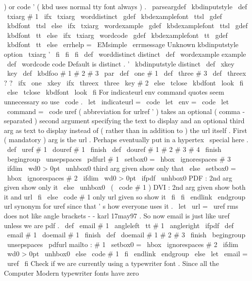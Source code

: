 )
%
or
code
'
(
kbd
uses
normal
tty
font
always
)
.
\
parseargdef
\
kbdinputstyle
{
%
\
def
\
txiarg
{
#
1
}
%
\
ifx
\
txiarg
\
worddistinct
\
gdef
\
kbdexamplefont
{
\
ttsl
}
\
gdef
\
kbdfont
{
\
ttsl
}
%
\
else
\
ifx
\
txiarg
\
wordexample
\
gdef
\
kbdexamplefont
{
\
ttsl
}
\
gdef
\
kbdfont
{
\
tt
}
%
\
else
\
ifx
\
txiarg
\
wordcode
\
gdef
\
kbdexamplefont
{
\
tt
}
\
gdef
\
kbdfont
{
\
tt
}
%
\
else
\
errhelp
=
\
EMsimple
\
errmessage
{
Unknown
kbdinputstyle
option
\
txiarg
'
}
%
\
fi
\
fi
\
fi
}
\
def
\
worddistinct
{
distinct
}
\
def
\
wordexample
{
example
}
\
def
\
wordcode
{
code
}
%
Default
is
distinct
.
'
\
kbdinputstyle
distinct
\
def
\
xkey
{
\
key
}
\
def
\
kbdfoo
#
1
#
2
#
3
\
par
{
\
def
\
one
{
#
1
}
\
def
\
three
{
#
3
}
\
def
\
threex
{
?
?
}
%
\
ifx
\
one
\
xkey
\
ifx
\
threex
\
three
\
key
{
#
2
}
%
\
else
{
\
tclose
{
\
kbdfont
\
look
}
}
\
fi
\
else
{
\
tclose
{
\
kbdfont
\
look
}
}
\
fi
}
%
For
indicateurl
env
command
quotes
seem
unnecessary
so
use
\
code
.
\
let
\
indicateurl
=
\
code
\
let
\
env
=
\
code
\
let
\
command
=
\
code
%
uref
(
abbreviation
for
urlref
'
)
takes
an
optional
(
comma
-
separated
)
%
second
argument
specifying
the
text
to
display
and
an
optional
third
%
arg
as
text
to
display
instead
of
(
rather
than
in
addition
to
)
the
url
%
itself
.
First
(
mandatory
)
arg
is
the
url
.
Perhaps
eventually
put
in
%
a
hypertex
\
special
here
.
%
\
def
\
uref
#
1
{
\
douref
#
1
\
finish
}
\
def
\
douref
#
1
#
2
#
3
#
4
\
finish
{
\
begingroup
\
unsepspaces
\
pdfurl
{
#
1
}
%
\
setbox0
=
\
hbox
{
\
ignorespaces
#
3
}
%
\
ifdim
\
wd0
>
0pt
\
unhbox0
%
third
arg
given
show
only
that
\
else
\
setbox0
=
\
hbox
{
\
ignorespaces
#
2
}
%
\
ifdim
\
wd0
>
0pt
\
ifpdf
\
unhbox0
%
PDF
:
2nd
arg
given
show
only
it
\
else
\
unhbox0
\
(
\
code
{
#
1
}
)
%
DVI
:
2nd
arg
given
show
both
it
and
url
\
fi
\
else
\
code
{
#
1
}
%
only
url
given
so
show
it
\
fi
\
fi
\
endlink
\
endgroup
}
%
url
synonym
for
uref
since
that
'
s
how
everyone
uses
it
.
%
\
let
\
url
=
\
uref
%
rms
does
not
like
angle
brackets
-
-
karl
17may97
.
%
So
now
email
is
just
like
uref
unless
we
are
pdf
.
%
%
\
def
\
email
#
1
{
\
angleleft
{
\
tt
#
1
}
\
angleright
}
\
ifpdf
\
def
\
email
#
1
{
\
doemail
#
1
\
finish
}
\
def
\
doemail
#
1
#
2
#
3
\
finish
{
\
begingroup
\
unsepspaces
\
pdfurl
{
mailto
:
#
1
}
%
\
setbox0
=
\
hbox
{
\
ignorespaces
#
2
}
%
\
ifdim
\
wd0
>
0pt
\
unhbox0
\
else
\
code
{
#
1
}
\
fi
\
endlink
\
endgroup
}
\
else
\
let
\
email
=
\
uref
\
fi
%
Check
if
we
are
currently
using
a
typewriter
font
.
Since
all
the
%
Computer
Modern
typewriter
fonts
have
zero
